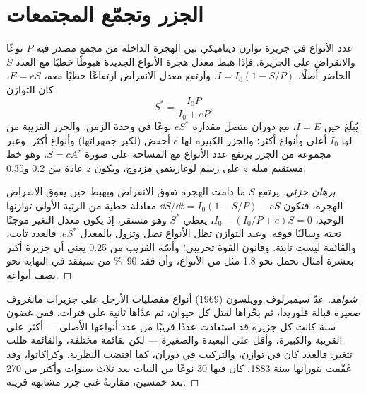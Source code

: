 \section{الجزر وتجمّع المجتمعات}

\begin{theorem}\label{thm:b1:ecosystem-dynamics:island}
عدد الأنواع في جزيرة توازن ديناميكي بين
الهجرة الداخلة من مجمع مصدر فيه $P$ نوعًا والانقراض على
الجزيرة. فإذا هبط معدل هجرة الأنواع الجديدة هبوطًا خطيًا مع
العدد $S$ الحاضر أصلًا، $I = I_0(1 - S/P)$، وارتفع معدل الانقراض
ارتفاعًا خطيًا معه، $E = eS$، كان التوازن
\[
S^* = \frac{I_0 P}{I_0 + eP} ,
\]
يُبلَغ حين $I = E$، مع دوران متصل مقداره $eS^*$ نوعًا في
وحدة الزمن. والجزر القريبة من  لها $I_0$ أعلى وأنواع
أكثر؛ والجزر الكبيرة لها $e$ أخفض (لكبر جمهراتها) وأنواع
أكثر. وعبر مجموعة من الجزر يرتفع عدد الأنواع مع المساحة
على صورة $S = cA^z$، وهو خط مستقيم ميله $z$ على رسم لوغاريتمي مزدوج، ويكون
$z$ عادة بين \num{0.2} و\num{0.35}.
\end{theorem}
\begin{proof}[برهان جزئي]
يرتفع $S$ ما دامت الهجرة تفوق الانقراض ويهبط حين
يفوق الانقراض الهجرة، فتكون $\dd S/\dd t = I_0(1 - S/P) - eS$
معادلة خطية من الرتبة الأولى توازنها الوحيد، $I_0 -
(I_0/P + e)S = 0$، يعطي $S^*$ وهو مستقر، إذ يكون معدل التغير
موجبًا تحته وسالبًا فوقه. وعند التوازن تظل الأنواع
تصل وتزول بالمعدل $eS^*$: فالعدد ثابت،
والقائمة ليست ثابتة. وقانون القوة تجريبي؛ وأسّه القريب من
\num{0.25} يعني أن جزيرة أكبر بعشرة أمثال تحمل نحو \num{1.8}
مثل من الأنواع، وأن فقد \qty{90}{\%} من  سيفقد
في النهاية نحو نصف أنواعه.
\end{proof}
\begin{proof}[شواهد]
عدّ سيمبرلوف وويلسون (1969) أنواع مفصليات الأرجل على جزيرات
مانغروف صغيرة قبالة فلوريدا، ثم بخّراها لقتل كل
حيوان، ثم عدّاها ثانية على فترات. ففي غضون سنة كانت كل جزيرة قد
استعادت عددًا قريبًا من عدد أنواعها الأصلي --- أكثر على
القريبة والكبيرة، وأقل على البعيدة والصغيرة --- لكن بقائمة
مختلفة، والقائمة ظلت تتغير: فالعدد كان في
توازن، والتركيب في دوران، كما اقتضت النظرية.
وكراكاتوا، وقد عُقّمت بثورانها سنة 1883، كان فيها \num{30} نوعًا من
النبات بعد ثلاث سنوات وأكثر من \num{270} بعد خمسين، مقاربةً
غنى جزر مشابهة قريبة.
\end{proof}


